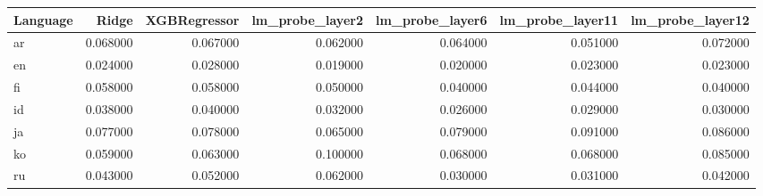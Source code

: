 \begin{tabular}{lrrrrrr}
\toprule
Language & Ridge & XGBRegressor & lm_probe_layer2 & lm_probe_layer6 & lm_probe_layer11 & lm_probe_layer12 \\
\midrule
ar & 0.068000 & 0.067000 & 0.062000 & 0.064000 & 0.051000 & 0.072000 \\
en & 0.024000 & 0.028000 & 0.019000 & 0.020000 & 0.023000 & 0.023000 \\
fi & 0.058000 & 0.058000 & 0.050000 & 0.040000 & 0.044000 & 0.040000 \\
id & 0.038000 & 0.040000 & 0.032000 & 0.026000 & 0.029000 & 0.030000 \\
ja & 0.077000 & 0.078000 & 0.065000 & 0.079000 & 0.091000 & 0.086000 \\
ko & 0.059000 & 0.063000 & 0.100000 & 0.068000 & 0.068000 & 0.085000 \\
ru & 0.043000 & 0.052000 & 0.062000 & 0.030000 & 0.031000 & 0.042000 \\
\bottomrule
\end{tabular}
